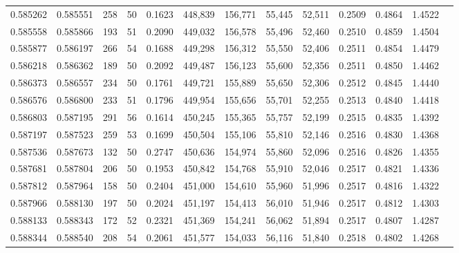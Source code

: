 \begin{tabular}{rrrrrrrrrrrrr}
0.585262 & 0.585551 &   258 &  50 &                                     0.1623 & 448,839 & 156,771 &  55,445 &  52,511 & 0.2509 & 0.4864 & 1.4522 \\
0.585558 & 0.585866 &   193 &  51 &                                     0.2090 & 449,032 & 156,578 &  55,496 &  52,460 & 0.2510 & 0.4859 & 1.4504 \\
0.585877 & 0.586197 &   266 &  54 &                                     0.1688 & 449,298 & 156,312 &  55,550 &  52,406 & 0.2511 & 0.4854 & 1.4479 \\
0.586218 & 0.586362 &   189 &  50 &                                     0.2092 & 449,487 & 156,123 &  55,600 &  52,356 & 0.2511 & 0.4850 & 1.4462 \\
0.586373 & 0.586557 &   234 &  50 &                                     0.1761 & 449,721 & 155,889 &  55,650 &  52,306 & 0.2512 & 0.4845 & 1.4440 \\
0.586576 & 0.586800 &   233 &  51 &                                     0.1796 & 449,954 & 155,656 &  55,701 &  52,255 & 0.2513 & 0.4840 & 1.4418 \\
0.586803 & 0.587195 &   291 &  56 &                                     0.1614 & 450,245 & 155,365 &  55,757 &  52,199 & 0.2515 & 0.4835 & 1.4392 \\
0.587197 & 0.587523 &   259 &  53 &                                     0.1699 & 450,504 & 155,106 &  55,810 &  52,146 & 0.2516 & 0.4830 & 1.4368 \\
0.587536 & 0.587673 &   132 &  50 &                                     0.2747 & 450,636 & 154,974 &  55,860 &  52,096 & 0.2516 & 0.4826 & 1.4355 \\
0.587681 & 0.587804 &   206 &  50 &                                     0.1953 & 450,842 & 154,768 &  55,910 &  52,046 & 0.2517 & 0.4821 & 1.4336 \\
0.587812 & 0.587964 &   158 &  50 &                                     0.2404 & 451,000 & 154,610 &  55,960 &  51,996 & 0.2517 & 0.4816 & 1.4322 \\
0.587966 & 0.588130 &   197 &  50 &                                     0.2024 & 451,197 & 154,413 &  56,010 &  51,946 & 0.2517 & 0.4812 & 1.4303 \\
0.588133 & 0.588343 &   172 &  52 &                                     0.2321 & 451,369 & 154,241 &  56,062 &  51,894 & 0.2517 & 0.4807 & 1.4287 \\
0.588344 & 0.588540 &   208 &  54 &                                     0.2061 & 451,577 & 154,033 &  56,116 &  51,840 & 0.2518 & 0.4802 & 1.4268 \\

\end{tabular}
